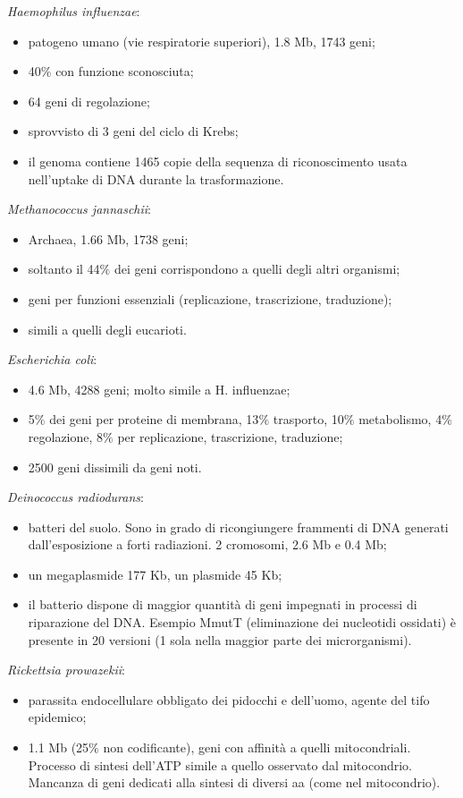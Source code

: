 \textit{Haemophilus influenzae}:
\begin{itemize}
    \item patogeno umano (vie respiratorie superiori), 1.8 Mb, 1743 geni;
    \item 40$\%$ con funzione sconosciuta;
    \item 64 geni di regolazione; 
    \item sprovvisto di 3 geni del ciclo di Krebs; 
    \item il genoma contiene 1465 copie della sequenza di riconoscimento usata nell'uptake di DNA durante la trasformazione.
\end{itemize}
\textit{Methanococcus jannaschii}: 
\begin{itemize}
    \item Archaea, 1.66 Mb, 1738 geni; 
    \item soltanto il 44$\%$ dei geni corrispondono a quelli degli altri organismi; 
    \item geni per funzioni  essenziali (replicazione, trascrizione, traduzione);
    \item simili a quelli degli eucarioti.
\end{itemize}
\textit{Escherichia coli}: 
\begin{itemize}
    \item 4.6 Mb, 4288 geni; molto simile a H. influenzae;
    \item 5$\%$ dei geni per proteine di membrana, 13$\%$ trasporto, 10$\%$ metabolismo, 4$\%$ regolazione, 8$\%$ per replicazione, trascrizione, traduzione;
    \item 2500 geni dissimili da geni noti.
\end{itemize}
\textit{Deinococcus radiodurans}:
\begin{itemize}
    \item batteri del suolo. Sono in grado di ricongiungere frammenti di DNA generati dall'esposizione a forti radiazioni. 2 cromosomi, 2.6 Mb e 0.4 Mb;
    \item un megaplasmide 177 Kb, un plasmide 45 Kb;
    \item il batterio dispone di maggior quantit\`a di geni impegnati in processi di riparazione del DNA. Esempio MmutT (eliminazione dei nucleotidi ossidati) \`e presente in 20 versioni (1 sola nella maggior parte dei microrganismi).
\end{itemize}
\textit{Rickettsia prowazekii}:
\begin{itemize}
    \item parassita endocellulare obbligato dei pidocchi e dell'uomo, agente del tifo epidemico; \item 1.1 Mb (25$\%$ non codificante), geni con affinit\`a a quelli mitocondriali. Processo di sintesi dell'ATP simile a quello osservato dal mitocondrio. Mancanza di geni dedicati alla sintesi di diversi aa (come nel mitocondrio).
\end{itemize}
